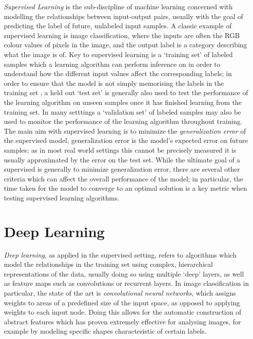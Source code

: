 \textit{Supervised Learning} is the sub-discipline of machine learning concerned with modelling the relationships between input-output pairs, usually with the goal of predicting the label of future, unlabeled input samples. A classic example of supervised learning is image classification, where the inputs are often the RGB colour values of pixels in the image, and the output label is a category describing what the image is of. Key to supervised learning is a `training set' of labeled samples which a learning algorithm can perform inference on in order to understand how the different input values affect the corresponding labels; in order to ensure that the model is not simply memorising the labels in the training set , a held out `test set' is generally also used to test the performance of the learning algorithm on unseen samples once it has finished learning from the training set. In many setttings a `validation set' of labeled samples may also be used to monitor the performance of the learning algorithm throughout training. The main aim with supervised learning is to minimize the \textit{generalization error} of the supervised model, generalization error is the model's expected error on future samples; as in most real world settings this cannot be precisely measured it is usually approximated by the error on the test set. While the ultimate goal of a supervised is generally to minimize generalization error, there are several other criteria which can affect the overall performance of the model; in particular, the time taken for the model to converge to an optimal solution is a key metric when testing supervised learning algorithms. 

\section{Deep Learning}
\textit{Deep learning}, as applied in the supervised setting, refers to algorithms which model the relationships in the training set using complex, hierarchical representations of the data, usually doing so using multiple `deep' layers, as well as feature maps such as convolutions or recurrent layers. In image classification in particular, the state of the art is \textit{convolutional neural networks}, which assigns weights to areas of a predefined size of the input space, as opposed to applying weights to each input node. Doing this allows for the automatic construction of abstract features which has proven extremely effective for analysing images, for example by modeling specific shapes characteristic of certain labels.

